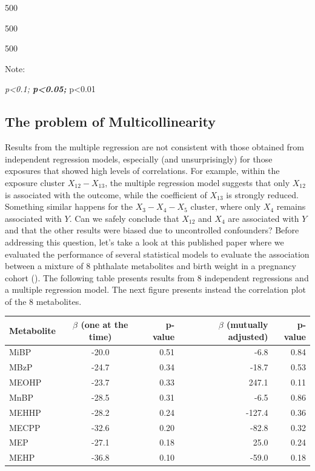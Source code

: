 \documentclass[
]{book}
\begin{document}
500

500

500

Note:

\emph{p\textless0.1; \textbf{p\textless0.05; }}p\textless0.01

\hypertarget{the-problem-of-multicollinearity}{%
\subsection{The problem of Multicollinearity}\label{the-problem-of-multicollinearity}}

Results from the multiple regression are not consistent with those obtained from independent regression models, especially (and unsurprisingly) for those exposures that showed high levels of correlations. For example, within the exposure cluster \(X_{12}-X_{13}\), the multiple regression model suggests that only \(X_{12}\) is associated with the outcome, while the coefficient of \(X_{13}\) is strongly reduced. Something similar happens for the \(X_3-X_4-X_5\) cluster, where only \(X_4\) remains associated with \(Y\). Can we safely conclude that \(X_{12}\) and \(X_4\) are associated with \(Y\) and that the other results were biased due to uncontrolled confounders? Before addressing this question, let's take a look at this published paper where we evaluated the performance of several statistical models to evaluate the association between a mixture of 8 phthalate metabolites and birth weight in a pregnancy cohort (\citet{chiu2018evaluating}). The following table presents results from 8 independent regressions and a multiple regression model. The next figure presents instead the correlation plot of the 8 metabolites.

\begin{longtable}[]{@{}lcrrr@{}}
\toprule
Metabolite & \(\beta\) (one at the time) & p-value & \(\beta\) (mutually adjusted) & p-value \\
\midrule
\endhead
MiBP & -20.0 & 0.51 & -6.8 & 0.84 \\
MBzP & -24.7 & 0.34 & -18.7 & 0.53 \\
MEOHP & -23.7 & 0.33 & 247.1 & 0.11 \\
MnBP & -28.5 & 0.31 & -6.5 & 0.86 \\
MEHHP & -28.2 & 0.24 & -127.4 & 0.36 \\
MECPP & -32.6 & 0.20 & -82.8 & 0.32 \\
MEP & -27.1 & 0.18 & 25.0 & 0.24 \\
MEHP & -36.8 & 0.10 & -59.0 & 0.18 \\
\bottomrule
\end{longtable}
\end{document}
